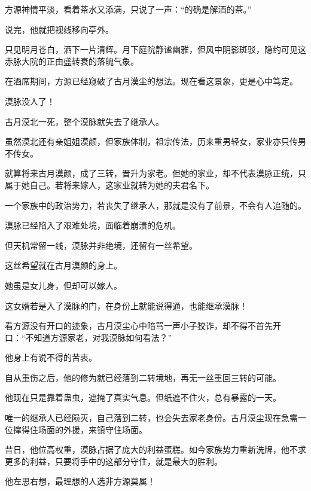 \begin{this_body}
方源神情平淡，看着茶水又添满，只说了一声：“的确是解酒的茶。”

说完，他就把视线移向亭外。

只见明月苍白，洒下一片清辉。月下庭院静谧幽雅，但风中阴影斑驳，隐约可见这赤脉大院的正由盛转衰的落魄气象。

在酒席期间，方源已经窥破了古月漠尘的想法。现在看这景象，更是心中笃定。

漠脉没人了！

古月漠北一死，整个漠脉就失去了继承人。

虽然漠北还有亲姐姐漠颜，但家族体制，祖宗传法，历来重男轻女，家业亦只传男不传女。

就算将来古月漠颜，成了三转，晋升为家老。但她的家业，却不代表漠脉正统，只属于她自己。若将来嫁人，这家业就转为她的夫君名下。

一个家族中的政治势力，若丧失了继承人，那就是没有了前景，不会有人追随的。

漠脉已经陷入了艰难处境，面临着崩溃的危机。

但天机常留一线，漠脉并非绝境，还留有一丝希望。

这丝希望就在古月漠颜的身上。

她虽是女儿身，但却可以嫁人。

这女婿若是入了漠脉的门，在身份上就能说得通，也能继承漠脉！

看方源没有开口的迹象，古月漠尘心中暗骂一声小子狡诈，却不得不首先开口：“不知道方源家老，对我漠脉如何看法？”

他身上有说不得的苦衷。

自从重伤之后，他的修为就已经落到二转境地，再无一丝重回三转的可能。

他现在只是靠着蛊虫，遮掩了真实气息。但纸遮不住火，总有暴露的一天。

唯一的继承人已经陨灭，自己落到二转，也会失去家老身份。古月漠尘现在急需一位撑得住场面的外援，来镇守住场面。

昔日，他位高权重，漠脉占据了庞大的利益蛋糕。如今家族势力重新洗牌，他不求更多的利益，只要将手中的这部分守住，就是最大的胜利。

他左思右想，最理想的人选非方源莫属！

\end{this_body}

